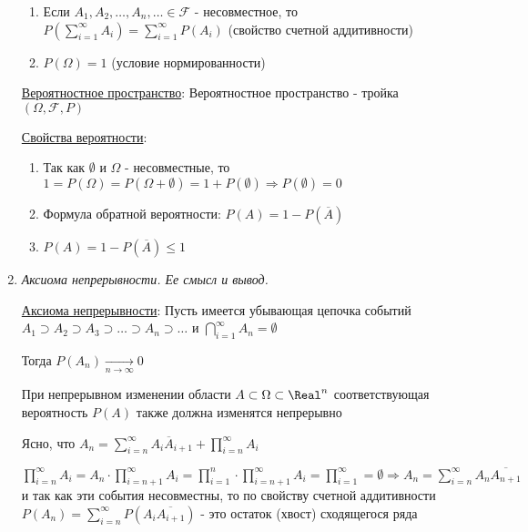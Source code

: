 \begin{enumerate}
\begin{enumerate}
        \item Если $A_1, A_2, \dots, A_n, \dots \in \mathcal{F}$ - несовместное, то $P(\sum_{i = 1}^\infty A_i) = \sum_{i = 1}^\infty P(A_i)$ (свойство счетной аддитивности)

        \item $P(\Omega) = 1$ (условие нормированности)
    \end{enumerate}

    \hyperlink{probabilityspace}{Вероятностное пространство}: Вероятностное пространство - тройка $(\Omega, \mathcal{F}, P)$

    \hyperlink{probabilityproperties}{Свойства вероятности}: 

    \begin{enumerate}
        \item Так как $\emptyset$ и $\Omega$ - несовместные, то $1 = P(\Omega) = P(\Omega + \emptyset) = 1 + P(\emptyset) \Longrightarrow P(\emptyset) = 0$

        \item Формула обратной вероятности: $P(A) = 1 - P(\overline{A})$

        \item $P(A) = 1 - P(\overline{A}) \leq 1$
    \end{enumerate}

    \item \textit{Аксиома непрерывности. Ее смысл и вывод.}

    \hyperlink{continuityaxiom}{Аксиома непрерывности}: \Ths Пусть имеется убывающая цепочка событий $A_1 \supset A_2 \supset A_3 \supset \dots \supset A_n \supset \dots$ и $\bigcap_{i = 1}^\infty A_n = \emptyset$

    Тогда $P(A_n) \underset{n \to \infty}{\to} 0$

    При непрерывном изменении области $A \subset \Omega \subset \Real^n$ соответствующая вероятность $P(A)$ также должна изменятся непрерывно

    \begin{MyProof}
        Ясно, что $A_n = \sum_{i = n}^\infty A_i \overline{A}_{i + 1} + \prod_{i = n}^\infty A_i$

        $\prod_{i = n}^\infty A_i = A_n \cdot \prod_{i = n + 1}^\infty A_i = \prod_{i = 1}^n
        \cdot \prod_{i = n + 1}^\infty A_i = \prod_{i = 1}^\infty = \emptyset \Longrightarrow
        A_n = \sum_{i = n}^\infty A_n \overline{A_{n + 1}}$ и так как эти события несовместны,
        то по свойству счетной аддитивности $P(A_n) = \sum_{i = n}^\infty P(A_i \overline{A_{i + 1}})$ - это остаток (хвост) сходящегося ряда


\end{MyProof}
\end{enumerate}
